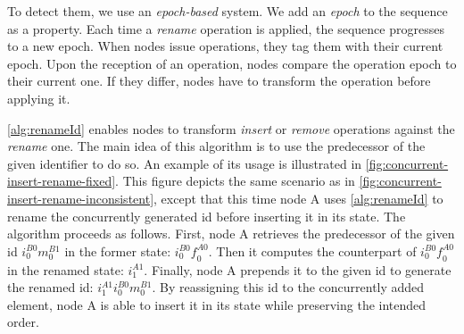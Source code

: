 \documentclass[sigplan,10pt,authorversion]{acmart}
\newcommand{\trm}[1]{\mathit{#1}}
\newcommand{\id}[3]{$\trm{#1}^{\trm{#2}}_{\trm{#3}}$}
\begin{document}
To detect them, we use an \emph{epoch-based} system.
We add an \emph{epoch} to the sequence as a property.
Each time a \emph{rename} operation is applied, the sequence progresses to a new epoch.
When nodes issue operations, they tag them with their current epoch.
Upon the reception of an operation, nodes compare the operation epoch to their current one.
If they differ, nodes have to transform the operation before applying it.

\autoref{alg:renameId} enables nodes to transform \emph{insert} or \emph{remove} operations against the \emph{rename} one.
The main idea of this algorithm is to use the predecessor of the given identifier to do so.
An example of its usage is illustrated in \autoref{fig:concurrent-insert-rename-fixed}.
This figure depicts the same scenario as in \autoref{fig:concurrent-insert-rename-inconsistent}, except that this time node A uses \autoref{alg:renameId} to rename the concurrently generated id before inserting it in its state.
The algorithm proceeds as follows.
First, node A retrieves the predecessor of the given id \id{i}{B0}{0}\id{m}{B1}{0} in the former state: \id{i}{B0}{0}\id{f}{A0}{0}.
Then it computes the counterpart of \id{i}{B0}{0}\id{f}{A0}{0} in the renamed state: \id{i}{A1}{1}.
Finally, node A prepends it to the given id to generate the renamed id: \id{i}{A1}{1}\id{i}{B0}{0}\id{m}{B1}{0}.
By reassigning this id to the concurrently added element, node A is able to insert it in its state while preserving the intended order.
\end{document}
